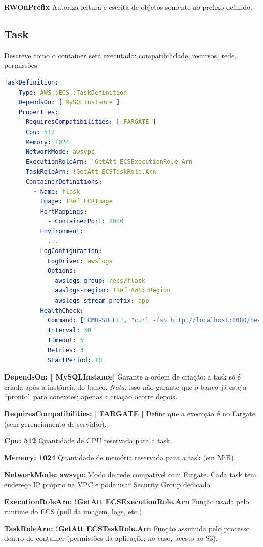 \textbf{RWOnPrefix} Autoriza leitura e escrita de objetos somente no prefixo definido.



\subsection{Task}
Descreve como o container será executado: compatibilidade, recursos, rede, permissões.

\begin{lstlisting}[language=YAML]
TaskDefinition:
    Type: AWS::ECS::TaskDefinition
    DependsOn: [ MySQLInstance ]
    Properties:
      RequiresCompatibilities: [ FARGATE ]
      Cpu: 512
      Memory: 1024
      NetworkMode: awsvpc
      ExecutionRoleArn: !GetAtt ECSExecutionRole.Arn
      TaskRoleArn: !GetAtt ECSTaskRole.Arn
      ContainerDefinitions:
        - Name: flask
          Image: !Ref ECRImage
          PortMappings:
            - ContainerPort: 8080
          Environment:
            ...
          LogConfiguration:
            LogDriver: awslogs
            Options:
              awslogs-group: /ecs/flask
              awslogs-region: !Ref AWS::Region
              awslogs-stream-prefix: app
          HealthCheck:
            Command: ["CMD-SHELL", "curl -fsS http://localhost:8080/healthcheck || exit 1"]
            Interval: 30
            Timeout: 5
            Retries: 3
            StartPeriod: 10
\end{lstlisting}

\textbf{DependsOn: [ MySQLInstance]} Garante a ordem de criação: a task só é criada após a instância do banco. 
\textit{Nota:} isso não garante que o banco já esteja “pronto” para conexões; apenas a criação ocorre depois.

\textbf{RequiresCompatibilities: [ FARGATE ]} Define que a execução é no Fargate (sem gerenciamento de servidor).

\textbf{Cpu: 512} Quantidade de CPU reservada para a task.

\textbf{Memory: 1024} Quantidade de memória reservada para a task (em MiB).

\textbf{NetworkMode: awsvpc} Modo de rede compatível com Fargate. Cada task tem endereço IP próprio na VPC e pode usar Security Group dedicado.

\textbf{ExecutionRoleArn: !GetAtt ECSExecutionRole.Arn} Função usada pelo runtime do ECS (pull da imagem, logs, etc.).

\textbf{TaskRoleArn: !GetAtt ECSTaskRole.Arn} Função assumida pelo processo dentro do container (permissões da aplicação; no caso, acesso ao S3).

